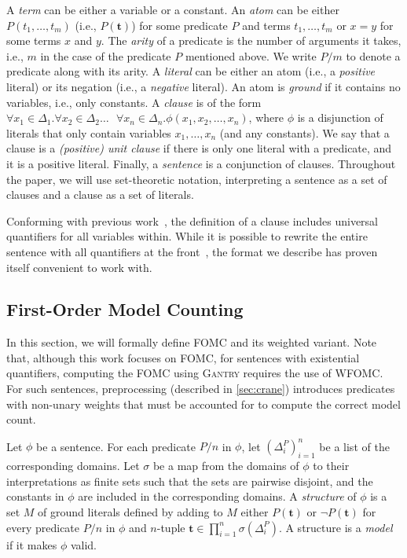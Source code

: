 \documentclass[a4paper,UKenglish,cleveref, autoref, thm-restate]{lipics-v2021}
\newcommand{\Cranetwo}{\textsc{Gantry}}
\begin{document}
A \emph{term} can be either a variable or a constant. An \emph{atom} can be
either $P(t_{1}, \dots, t_{m})$ (i.e., $P(\mathbf{t})$) for some predicate $P$
and terms $t_{1}, \dots, t_{m}$ or $x=y$ for some terms $x$ and $y$. The
\emph{arity} of a predicate is the number of arguments it takes, i.e., $m$ in
the case of the predicate $P$ mentioned above. We write $P/m$ to denote a
predicate along with its arity. A \emph{literal} can be either an atom (i.e., a
\emph{positive} literal) or its negation (i.e., a \emph{negative} literal). An
atom is \emph{ground} if it contains no variables, i.e., only constants. A
\emph{clause} is of the form $\forall x_{1} \in \Delta_{1}\text{.
}\forall x_{2} \in \Delta_{2}\dots\text{ }\forall x_{n} \in \Delta_{n}\text{.
}\phi(x_{1}, x_{2}, \dots, x_{n})$, where $\phi$ is a disjunction of literals
that only contain variables $x_{1}, \dots, x_{n}$ (and any constants). We say
that a clause is a \emph{(positive) unit clause} if there is only one literal
with a predicate, and it is a positive literal. Finally, a \emph{sentence} is a
conjunction of clauses. Throughout the paper, we will use set-theoretic
notation, interpreting a sentence as a set of clauses and a clause as a set of
literals.

\begin{remark*}
  Conforming with previous work~\cite{DBLP:conf/ijcai/BroeckTMDR11}, the
  definition of a clause includes universal quantifiers for all variables
  within. While it is possible to rewrite the entire sentence with all
  quantifiers at the front~\cite{hinman2018fundamentals}, the format we describe
  has proven itself convenient to work with.
\end{remark*}

\subsection{First-Order Model Counting}\label{sec:fomc}

In this section, we will formally define FOMC and its weighted variant. Note
that, although this work focuses on FOMC, for sentences with existential
quantifiers, computing the FOMC using \Cranetwo{} requires the use of WFOMC\@.
For such sentences, preprocessing (described in \cref{sec:crane}) introduces
predicates with non-unary weights that must be accounted for to compute the
correct model count.

\begin{definition}\label{def:model}
  Let $\phi$ be a sentence. For each predicate $P/n$ in $\phi$, let
  ${(\Delta_{i}^{P})}_{i=1}^{n}$ be a list of the corresponding domains. Let
  $\sigma$ be a map from the domains of $\phi$ to their interpretations as
  finite sets such that the sets are pairwise disjoint, and the constants in
  $\phi$ are included in the corresponding domains. A \emph{structure} of $\phi$
  is a set $M$ of ground literals defined by adding to $M$ either
  $P(\mathbf{t})$ or $\neg P(\mathbf{t})$ for every predicate $P/n$ in $\phi$
  and $n$-tuple $\mathbf{t} \in \prod_{i=1}^{n} \sigma(\Delta_{i}^{P})$. A
  structure is a \emph{model} if it makes $\phi$ valid.
\end{definition}
\end{document}

